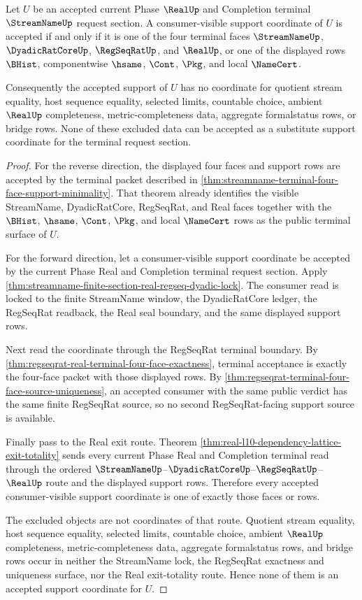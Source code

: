 \begin{theorem}
\label{thm:streamname-terminal-four-face-support-exhaustion}
Let $U$ be an accepted current Phase $\RealUp$ and Completion terminal
$\StreamNameUp$ request section. A consumer-visible support coordinate of $U$
is accepted if and only if it is one of the four terminal faces
$\StreamNameUp$, $\DyadicRatCoreUp$, $\RegSeqRatUp$, and $\RealUp$, or one of
the displayed rows $\BHist$, componentwise $\hsame$, $\Cont$, $\Pkg$, and local
$\NameCert$.

Consequently the accepted support of $U$ has no coordinate for quotient stream
equality, host sequence equality, selected limits, countable choice, ambient
$\RealUp$ completeness, metric-completeness data, aggregate formalstatus rows,
or bridge rows. None of these excluded data can be accepted as a substitute
support coordinate for the terminal request section.
\end{theorem}
\begin{proof}
For the reverse direction, the displayed four faces and support rows are
accepted by the terminal packet described in
\autoref{thm:streamname-terminal-four-face-support-minimality}. That theorem
already identifies the visible StreamName, DyadicRatCore, RegSeqRat, and Real
faces together with the $\BHist$, $\hsame$, $\Cont$, $\Pkg$, and local
$\NameCert$ rows as the public terminal surface of $U$.

For the forward direction, let a consumer-visible support coordinate be
accepted by the current Phase Real and Completion terminal request section.
Apply \autoref{thm:streamname-finite-section-real-regseq-dyadic-lock}. The
consumer read is locked to the finite StreamName window, the DyadicRatCore
ledger, the RegSeqRat readback, the Real seal boundary, and the same displayed
support rows.

Next read the coordinate through the RegSeqRat terminal boundary. By
\autoref{thm:regseqrat-real-terminal-four-face-exactness}, terminal acceptance
is exactly the four-face packet with those displayed rows. By
\autoref{thm:regseqrat-terminal-four-face-source-uniqueness}, an accepted
consumer with the same public verdict has the same finite RegSeqRat source, so
no second RegSeqRat-facing support source is available.

Finally pass to the Real exit route. Theorem
\autoref{thm:real-l10-dependency-lattice-exit-totality} sends every current
Phase Real and Completion terminal read through the ordered
$\StreamNameUp$--$\DyadicRatCoreUp$--$\RegSeqRatUp$--$\RealUp$ route and the
displayed support rows. Therefore every accepted consumer-visible support
coordinate is one of exactly those faces or rows.

The excluded objects are not coordinates of that route. Quotient stream
equality, host sequence equality, selected limits, countable choice, ambient
$\RealUp$ completeness, metric-completeness data, aggregate formalstatus rows,
and bridge rows occur in neither the StreamName lock, the RegSeqRat exactness
and uniqueness surface, nor the Real exit-totality route. Hence none of them is
an accepted support coordinate for $U$.
\end{proof}

